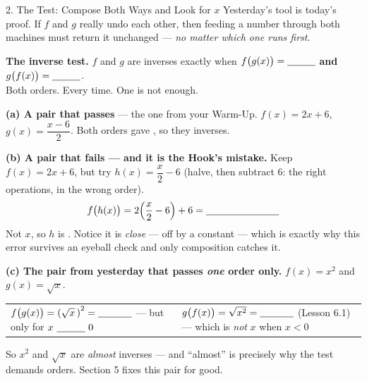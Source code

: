 \documentclass[10pt]{article}
\begin{document}
\begin{notesbox}{2. The Test: Compose Both Ways and Look for $x$}
Yesterday's tool is today's proof. If $f$ and $g$ really undo each other, then feeding a number
through both machines must return it unchanged --- \emph{no matter which one runs first}.
\begin{center}
\begin{tcolorbox}[colback=goldbg, colframe=goldacc, boxrule=0.8pt, arc=1.5mm, width=0.94\linewidth,
    left=3mm, right=3mm, top=2mm, bottom=2mm]
\centering\small
\textbf{The inverse test.} \quad $f$ and $g$ are inverses \; exactly when \;
$f\big(g(x)\big)=\blank{1.0cm}$ \; \textbf{and} \; $g\big(f(x)\big)=\blank{1.0cm}$.
\\[3pt]
Both orders. Every time. One is not enough.
\end{tcolorbox}
\end{center}
\vspace{2pt}
\textbf{(a) A pair that passes} --- the one from your Warm-Up. \quad $f(x)=2x+6$, \;
$g(x)=\dfrac{x-6}{2}$. \quad Both orders gave \blank{1.0cm}, so they \blank{2.4cm} inverses.

\vspace{5pt}
\textbf{(b) A pair that fails --- and it is the Hook's mistake.} Keep $f(x)=2x+6$, but try
$h(x)=\dfrac{x}{2}-6$ (halve, then subtract $6$: the right operations, in the wrong order).
\[
  f\big(h(x)\big)=2\!\left(\frac{x}{2}-6\right)+6=\blank{2.6cm}
\]
Not $x$, so $h$ is \blank{2.4cm}. Notice it is \emph{close} --- off by a constant --- which is
exactly why this error survives an eyeball check and only composition catches it.

\vspace{5pt}
\textbf{(c) The pair from yesterday that passes \emph{one} order only.} $f(x)=x^{2}$ and
$g(x)=\sqrt{x}$.
\begin{center}
\renewcommand{\arraystretch}{1.5}
\begin{tabularx}{0.96\linewidth}{@{}X|X@{}}
$f\big(g(x)\big)=\left(\sqrt{x}\,\right)^{2}=\blank{1.2cm}$ \; --- but only for $x\ \blank{1.0cm}\ 0$ &
$g\big(f(x)\big)=\sqrt{x^{2}}=\blank{1.2cm}$ \; (Lesson 6.1) --- which is \emph{not} $x$ when $x<0$ \\
\end{tabularx}
\end{center}
\vspace{-2pt}
So $x^{2}$ and $\sqrt{x}$ are \emph{almost} inverses --- and ``almost'' is precisely why the test
demands \blank{2.4cm} orders. Section 5 fixes this pair for good.
\end{notesbox}
\end{document}
